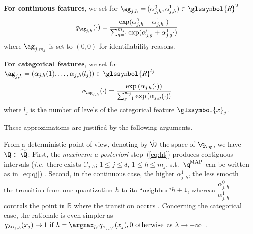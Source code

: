 


 {\bf For continuous features}, we set for $\ag_{j,h} = (\alpha^0_{j,h},\alpha^1_{j,h}) \in \glssymbol{R}^2$
\begin{equation} \label{eq:softmax}
q_{\ag_{j,h}}(\cdot) = \frac{\exp(\alpha^0_{j,h} + \alpha^1_{j,h}  \cdot)}{\sum_{g=1}^{m_j} \exp(\alpha^0_{j,g} + \alpha^1_{j,g}  \cdot)}
\end{equation}
where $\ag_{j,m_j}$ is set to $(0,0)$ for identifiability reasons.




{\bf For categorical features}, we set for $\ag_{j,h}=\left(\alpha_{j,h}(1),\ldots, \alpha_{j,h}(l_j)\right) \in \glssymbol{R}^{l_j}$
\[q_{\ag_{j,h}}(\cdot) = \frac{\exp\left(\alpha_{j,h}(\cdot)\right)}{\sum_{g=1}^{m_j} \exp\left(\alpha_{j,g}(\cdot)\right)}\]
where $l_j$ is the number of levels of the categorical feature $\glssymbol{x}_j$.

These approximations are justified by the following arguments. 

From a deterministic point of view, denoting by $\tilde{\Q}$ the space of $\q_{\ag}$, we have $\Q \subset \widetilde{\Q}$: First, the \textit{maximum a posteriori} step~(\ref{eq:ht}) produces contiguous intervals (\textit{i.e.}\ there exists $C_{j,h}$; $1 \leq j \leq d$, $1 \leq h \leq m_j$, s.t.\ ${\q}^{\text{MAP}}$ can be written as in~\ref{eq:qj}) \cite{same2011model}. Second, in the continuous case, the higher $\alpha_{j,h}^1$, the less smooth the transition from one quantization $h$ to its ``neighbor''\footnotemark[1] $h+1$, whereas $\dfrac{\alpha_{j,h}^0}{\alpha_{j,h}^1}$ controls the point in $\mathbb{R}$ where the transition occurs \cite{chamroukhi2009regression}. Concerning the categorical case, the rationale is even simpler as $q_{\lambda \alpha_{j,h}}(x_j) \to 1 \text{ if } h = \argmax_{h'} q_{\alpha_{j,h'}}(x_j), 0 \text{ otherwise}$ as $\lambda \to +\infty$~\cite{reverdy2016parameter}.

